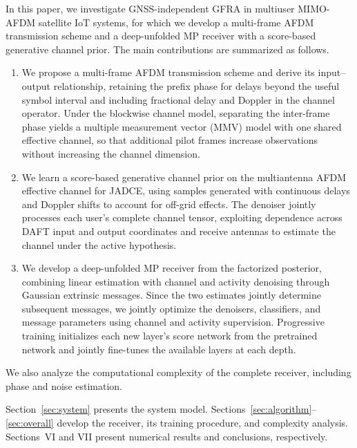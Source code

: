 In this paper, we investigate GNSS-independent GFRA in multiuser
MIMO-AFDM satellite IoT systems, for which we develop a multi-frame
AFDM transmission scheme and a deep-unfolded MP receiver with a
score-based generative channel prior.
The main contributions are summarized as follows.
\begin{enumerate}[label=\arabic*)]
\item We propose a multi-frame AFDM transmission scheme and derive its
input--output relationship, retaining the prefix phase for delays beyond
the useful symbol interval and including fractional delay and Doppler
in the channel operator. Under the blockwise channel model, separating
the inter-frame phase yields a multiple measurement vector (MMV) model
with one shared effective channel, so that additional pilot frames
increase observations without increasing the channel dimension.

\item We learn a score-based generative channel prior on the multiantenna
AFDM effective channel for JADCE, using samples generated with
continuous delays and Doppler shifts to account for off-grid effects.
The denoiser jointly processes each user's complete channel tensor,
exploiting dependence across DAFT input and output coordinates and
receive antennas to estimate the channel under the active hypothesis.

\item We develop a deep-unfolded MP receiver from the factorized posterior,
combining linear estimation with channel and activity denoising through
Gaussian extrinsic messages. Since the two estimates jointly determine
subsequent messages, we jointly optimize the denoisers, classifiers,
and message parameters using channel and activity supervision. Progressive
training initializes each new layer's score network from the pretrained
network and jointly fine-tunes the available layers at each depth.
\end{enumerate}

We also analyze the computational complexity of the complete receiver,
including phase and noise estimation.


Section~\ref{sec:system} presents the system model.
Sections~\ref{sec:algorithm}--\ref{sec:overall} develop the receiver,
its training procedure, and complexity analysis. Sections~VI and VII
present numerical results and conclusions, respectively.
